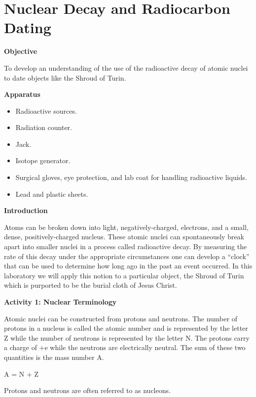 
\section{Nuclear Decay and Radiocarbon Dating}

\makelabheader %

\textbf{Objective}

To develop an understanding of the use of the radioactive decay of
atomic nuclei to date objects like the Shroud of Turin.

\textbf{Apparatus}

\begin{itemize}

\item Radioactive sources.
\item Radiation counter.
\item Jack.
\item Isotope generator.
\item Surgical gloves, eye protection, and lab coat for handling radioactive liquids.
\item Lead and plastic sheets.

\end{itemize}

\textbf{Introduction}

Atoms can be broken down into light, negatively-charged, electrons,
and a small, dense, positively-charged nucleus. These atomic nuclei
can spontaneously break apart into smaller nuclei in a process called
radioactive decay. By measuring the rate of this decay under the appropriate
circumstances one can develop a {}``clock'' that can be used to
determine how long ago in the past an event occurred. In this laboratory
we will apply this notion to a particular object, the Shroud of Turin
which is purported to be the burial cloth of Jesus Christ.

\textbf{Activity 1: Nuclear Terminology }

Atomic nuclei can be constructed from protons and neutrons. The number
of protons in a nucleus is called the atomic number and is represented
by the letter Z while the number of neutrons is represented by the
letter N. The protons carry a charge of +e while the neutrons are
electrically neutral. The sum of these two quantities is the mass
number A.

{\centering A = N + Z\par}

Protons and neutrons are often referred to as nucleons.

